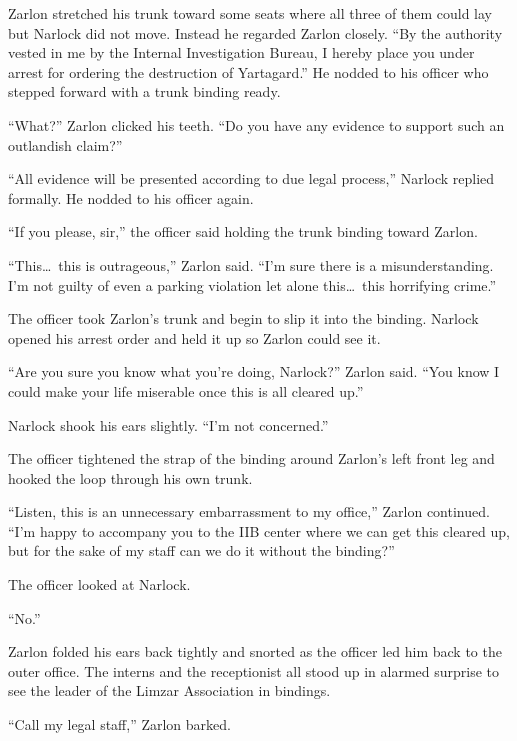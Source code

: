 Zarlon stretched his trunk toward some seats where all three of them could lay but Narlock did
not move. Instead he regarded Zarlon closely. ``By the authority vested in me by the Internal
Investigation Bureau, I hereby place you under arrest for ordering the destruction of
Yartagard.'' He nodded to his officer who stepped forward with a trunk binding ready.

``What?'' Zarlon clicked his teeth. ``Do you have any evidence to support such an outlandish
claim?''

``All evidence will be presented according to due legal process,'' Narlock replied formally. He
nodded to his officer again.

``If you please, sir,'' the officer said holding the trunk binding toward Zarlon.

``This\ldots\ this is outrageous,'' Zarlon said. ``I'm sure there is a misunderstanding. I'm not
guilty of even a parking violation let alone this\ldots\ this horrifying crime.''

The officer took Zarlon's trunk and begin to slip it into the binding. Narlock opened his arrest
order and held it up so Zarlon could see it.

``Are you sure you know what you're doing, Narlock?'' Zarlon said. ``You know I could make your
life miserable once this is all cleared up.''

Narlock shook his ears slightly. ``I'm not concerned.''

The officer tightened the strap of the binding around Zarlon's left front leg and hooked the
loop through his own trunk.

``Listen, this is an unnecessary embarrassment to my office,'' Zarlon continued. ``I'm happy to
accompany you to the IIB center where we can get this cleared up, but for the sake of my staff
can we do it without the binding?''

The officer looked at Narlock.

``No.''
 
Zarlon folded his ears back tightly and snorted as the officer led him back to the outer office.
The interns and the receptionist all stood up in alarmed surprise to see the leader of the
Limzar Association in bindings.

``Call my legal staff,'' Zarlon barked.


